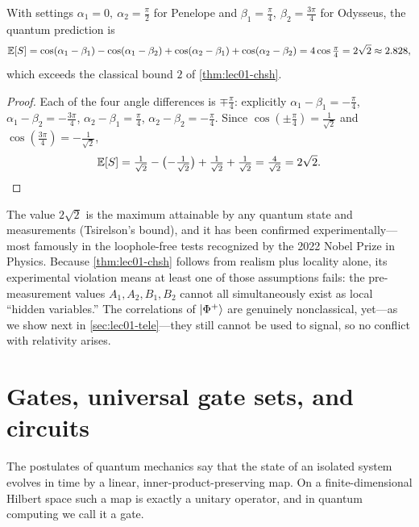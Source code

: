 \begin{corollary}\label{cor:lec01-tsirelson}
With settings $\alpha_1=0,\ \alpha_2=\tfrac{\pi}{2}$ for Penelope and
$\beta_1=\tfrac{\pi}{4},\ \beta_2=\tfrac{3\pi}{4}$ for Odysseus, the quantum prediction is
\[
  \mathbb{E}[S]=\cos(\alpha_1-\beta_1)-\cos(\alpha_1-\beta_2)+\cos(\alpha_2-\beta_1)+\cos(\alpha_2-\beta_2)
       =4\cos\tfrac{\pi}{4}=2\sqrt2\approx2.828,
\]
which exceeds the classical bound $2$ of \cref{thm:lec01-chsh}.
\end{corollary}

\begin{proof}
Each of the four angle differences is $\mp\tfrac{\pi}{4}$: explicitly
$\alpha_1-\beta_1=-\tfrac{\pi}{4}$, $\alpha_1-\beta_2=-\tfrac{3\pi}{4}$,
$\alpha_2-\beta_1=\tfrac{\pi}{4}$, $\alpha_2-\beta_2=-\tfrac{\pi}{4}$. Since
$\cos(\pm\tfrac{\pi}{4})=\tfrac{1}{\sqrt2}$ and $\cos(\tfrac{3\pi}{4})=-\tfrac{1}{\sqrt2}$,
\[
  \mathbb{E}[S]=\tfrac{1}{\sqrt2}-\bigl(-\tfrac{1}{\sqrt2}\bigr)+\tfrac{1}{\sqrt2}+\tfrac{1}{\sqrt2}
       =\tfrac{4}{\sqrt2}=2\sqrt2. \qedhere
\]
\end{proof}

\begin{remark}
The value $2\sqrt2$ is the maximum attainable by any quantum state and measurements
(Tsirelson's bound), and it has been confirmed experimentally---most famously in the
loophole-free tests recognized by the 2022 Nobel Prize in Physics. Because
\cref{thm:lec01-chsh} follows from realism plus locality alone, its experimental
violation means at least one of those assumptions fails: the pre-measurement values
$A_1,A_2,B_1,B_2$ cannot all simultaneously exist as local ``hidden variables.'' The
correlations of $\ket{\Phi^{+}}$ are genuinely nonclassical, yet---as we show next in
\cref{sec:lec01-tele}---they still cannot be used to signal, so no conflict with
relativity arises.
\end{remark}

\section{Gates, universal gate sets, and circuits}
\label{sec:lec01-3}

The postulates of quantum mechanics say that the state of an isolated system evolves
in time by a linear, inner-product-preserving map. On a finite-dimensional Hilbert
space such a map is exactly a unitary operator, and in quantum computing we call it
a gate.

